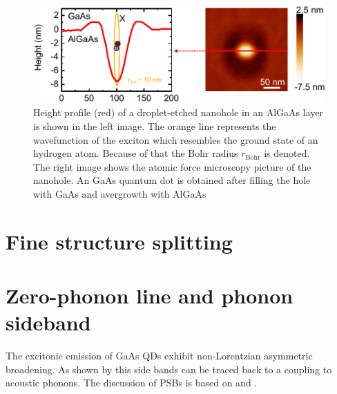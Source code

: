 

\begin{figure}[H]
	\centering
	\includegraphics[width=0.9\linewidth]{figures/quantum-dot/QD_plot_AFM}
	\caption[Height profile and AFM picture of a droplet-etched nanohole in an AlGaAs layer]{Height profile (red) of a droplet-etched nanohole in an AlGaAs layer is shown in the left image.
	The orange line represents the wavefunction of the exciton which resembles the ground state of an hydrogen atom.
	Because of that the Bohr radius $r_{\textrm{Bohr}}$ is denoted.
	The right image shows the atomic force microscopy picture of the nanohole.
	An GaAs quantum dot is obtained after filling the hole with GaAs and avergrowth with AlGaAs~\cite{reindl_highly_2019}}
	\label{fig:qdplotafm}
\end{figure}

\section{Fine structure splitting}




\section{Zero-phonon line and phonon sideband}
The excitonic emission of \ac{GaAs} \acp{QD} exhibit non-Lorentzian asymmetric broadening. As shown by \textcite{peter_phonon_2004} this side bands can be traced back to a coupling to acoustic phonons.
The discussion of \acp{PSB} is based on \textcite{friedrich_photochemical_1984} and  \textcite{peter_phonon_2004}.

